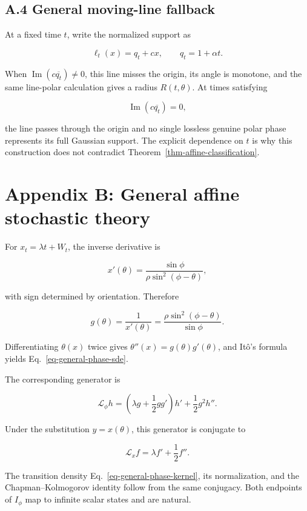 \documentclass[
  english,
  10pt,
  letterpaper,
  DIV=11,
  numbers=noendperiod]{scrartcl}
\theoremstyle{definition}
\theoremstyle{plain}
\theoremstyle{plain}
\theoremstyle{remark}
\begin{document}
\subsection*{A.4 General moving-line
fallback}\label{a.4-general-moving-line-fallback}

At a fixed time \(t\), write the normalized support as

\[
\ell_t(x)=q_t+cx,\qquad q_t=1+\alpha t.
\]

When \(\operatorname{Im}(c\overline{q_t})\ne0\), this line misses the
origin, its angle is monotone, and the same line-polar calculation gives
a radius \(R(t,\theta)\). At times satisfying

\[
\operatorname{Im}(c\overline{q_t})=0,
\]

the line passes through the origin and no single lossless genuine polar
phase represents its full Gaussian support. The explicit dependence on
\(t\) is why this construction does not contradict
Theorem~\ref{thm-affine-classification}.

\section*{Appendix B: General affine stochastic
theory}\label{sec-appendix-affine}

For \(x_t=\lambda t+W_t\), the inverse derivative is

\[
x'(\theta)
=\frac{\sin\phi}{\rho\sin^2(\phi-\theta)},
\]

with sign determined by orientation. Therefore

\[
g(\theta)=\frac1{x'(\theta)}
=\frac{\rho\sin^2(\phi-\theta)}{\sin\phi}.
\]

Differentiating \(\theta(x)\) twice gives
\(\theta''(x)=g(\theta)g'(\theta)\), and Itô's formula yields
Eq.~\ref{eq-general-phase-sde}.

The corresponding generator is

\[
\mathcal L_\phi h
=
\left(\lambda g+\frac12gg'\right)h'
+\frac12g^2h''.
\]

Under the substitution \(y=x(\theta)\), this generator is conjugate to

\[
\mathcal L_xf=\lambda f'+\frac12f''.
\]

The transition density Eq.~\ref{eq-general-phase-kernel}, its
normalization, and the Chapman--Kolmogorov identity follow from the same
conjugacy. Both endpoints of \(I_\phi\) map to infinite scalar states
and are natural.
\end{document}
